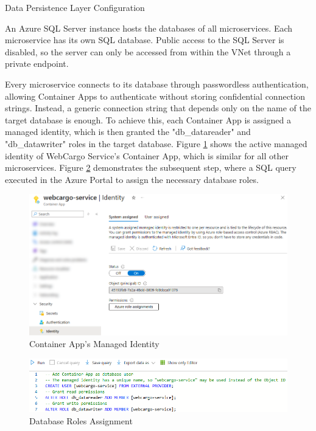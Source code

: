 \documentclass[12pt, reqno, oneside]{amsbook}
\makeatletter
\def\subsection{\@startsection{subsection}{2}%
      \z@{.5\linespacing\@plus.7\linespacing}{.25\linespacing}%
      {\normalfont\bfseries\flushleft}}
\theoremstyle{definition}
\theoremstyle{definition}
\numberwithin{section}{chapter}
\numberwithin{table}{chapter}
\numberwithin{figure}{chapter}
\makeatother
\begin{document}
\subsection{Data Persistence Layer Configuration}

An Azure SQL Server instance hosts the databases of all microservices. Each microservice has its own SQL database. Public access to the SQL Server is disabled, so the server can only be accessed from within the \ac{VNet} through a private endpoint.

Every microservice connects to its database through passwordless authentication, allowing Container Apps to authenticate without storing confidential connection strings. Instead, a generic connection string that depends only on the name of the target database is enough. To achieve this, each Container App is assigned a managed identity, which is then granted the "db\_datareader" and "db\_datawriter" roles in the target database. Figure \ref{Figure:DatabaseConfigurationManagedIdentity} shows the active managed identity of WebCargo Service's Container App, which is similar for all other microservices.
Figure \ref{Figure:DatabaseConfigurationQuery} demonstrates the subsequent step, where a \ac{SQL} query executed in the Azure Portal to assign the necessary database roles.

\begin{figure}[H]
  \centering
  \includegraphics[width=0.9\linewidth]{images/DatabaseConfigurationManagedIdentity.png}
  \caption{\label{Figure:DatabaseConfigurationManagedIdentity}Container App's Managed Identity}
\end{figure}

\begin{figure}[H]
  \centering
  \includegraphics[width=1\linewidth]{images/DatabaseConfigurationQuery.png}
  \caption{\label{Figure:DatabaseConfigurationQuery}Database Roles Assignment}
\end{figure}
\end{document}
